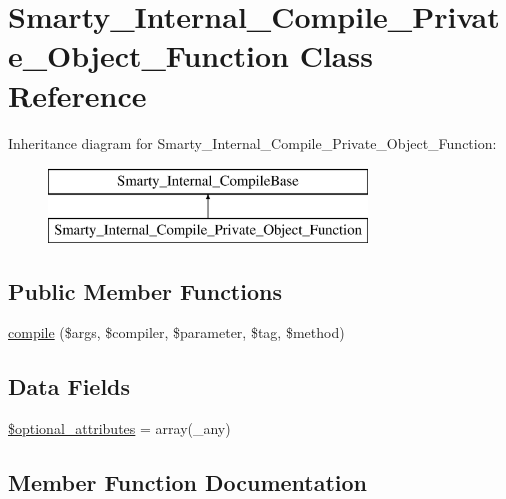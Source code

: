 \hypertarget{class_smarty___internal___compile___private___object___function}{}\section{Smarty\+\_\+\+Internal\+\_\+\+Compile\+\_\+\+Private\+\_\+\+Object\+\_\+\+Function Class Reference}
\label{class_smarty___internal___compile___private___object___function}
Inheritance diagram for Smarty\+\_\+\+Internal\+\_\+\+Compile\+\_\+\+Private\+\_\+\+Object\+\_\+\+Function\+:\begin{figure}[H]
\begin{center}
\leavevmode
\includegraphics[height=2.000000cm]{class_smarty___internal___compile___private___object___function}
\end{center}
\end{figure}
\subsection*{Public Member Functions}
\begin{DoxyCompactItemize}
\item 
\hyperlink{class_smarty___internal___compile___private___object___function_a7ec609b50c3b7c79cfd21ed991e01235}{compile} (\$args, \$compiler, \$parameter, \$tag, \$method)
\end{DoxyCompactItemize}
\subsection*{Data Fields}
\begin{DoxyCompactItemize}
\item 
\hyperlink{class_smarty___internal___compile___private___object___function_a899d1eb4a6fecbd6ce696adb171c80a4}{\$optional\+\_\+attributes} = array(\textquotesingle{}\+\_\+any\textquotesingle{})
\end{DoxyCompactItemize}


\subsection{Member Function Documentation}
\hypertarget{class_smarty___internal___compile___private___object___function_a7ec609b50c3b7c79cfd21ed991e01235}{}
